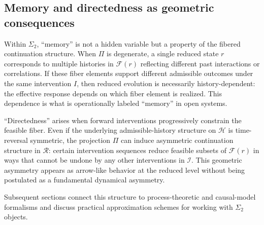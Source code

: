\subsection{Memory and directedness as geometric consequences}

Within $\Sigma_2$, ``memory'' is not a hidden variable but a property of the fibered continuation
structure. When $\Pi$ is degenerate, a single reduced state $r$ corresponds to multiple histories
in $\mathcal{F}(r)$ reflecting different past interactions or correlations. If these fiber elements
support different admissible outcomes under the same intervention $I$, then reduced evolution is
necessarily history-dependent: the effective response depends on which fiber element is realized.
This dependence is what is operationally labeled ``memory'' in open systems.

``Directedness'' arises when forward interventions progressively constrain the feasible fiber.
Even if the underlying admissible-history structure on $\mathcal{H}$ is time-reversal symmetric,
the projection $\Pi$ can induce asymmetric continuation structure in $\mathcal{R}$: certain
intervention sequences reduce feasible subsets of $\mathcal{F}(r)$ in ways that cannot be undone
by any other interventions in $\mathcal{I}$. This geometric asymmetry appears as arrow-like
behavior at the reduced level without being postulated as a fundamental dynamical asymmetry.

Subsequent sections connect this structure to process-theoretic and causal-model formalisms and
discuss practical approximation schemes for working with $\Sigma_2$ objects.